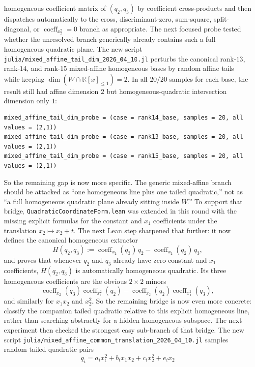 \documentclass[11pt]{article}
\begin{document}
homogeneous coefficient matrix of \((q_2,q_3)\) by coefficient cross-products
and then dispatches automatically to the cross, discriminant-zero, sum-square,
split-diagonal, or \(\operatorname{coeff}_{x_2^2}=0\) branch as appropriate.
The next focused probe tested whether the unresolved branch generically already
contains such a full homogeneous quadratic plane. The new script
\texttt{julia/mixed\_affine\_tail\_dim\_2026\_04\_10.jl} perturbs the canonical
rank-$13$, rank-$14$, and rank-$15$ mixed-affine homogeneous bases by random
affine tails while keeping \(\dim(W \cap \mathbb{R}[x]_{\le 1})=2\). In all
$20/20$ samples for each base, the result still had affine dimension $2$ but
homogeneous-quadratic intersection dimension only $1$:
\begin{verbatim}
mixed_affine_tail_dim_probe = (case = rank14_base, samples = 20, all values = (2,1))
mixed_affine_tail_dim_probe = (case = rank13_base, samples = 20, all values = (2,1))
mixed_affine_tail_dim_probe = (case = rank15_base, samples = 20, all values = (2,1))
\end{verbatim}
So the remaining gap is now more specific. The generic mixed-affine branch
should be attacked as ``one homogeneous line plus one tailed quadratic,'' not
as ``a full homogeneous quadratic plane already sitting inside \(W\).'' To
support that bridge, \texttt{QuadraticCoordinateForm.lean} was extended in this
round with the missing explicit formulas for the constant and \(x_1\)
coefficients under the translation \(x_2 \mapsto x_2+t\).
The next Lean step sharpened that further: it now defines the canonical
homogeneous extractor
\[
  H(q_2,q_3)
  :=
  \operatorname{coeff}_{x_2}(q_3)\,q_2
  -
  \operatorname{coeff}_{x_2}(q_2)\,q_3,
\]
and proves that whenever \(q_2\) and \(q_3\) already have zero constant and
\(x_1\) coefficients, \(H(q_2,q_3)\) is automatically homogeneous quadratic.
Its three homogeneous coefficients are the obvious \(2\times2\) minors
\[
  \operatorname{coeff}_{x_2}(q_3)\operatorname{coeff}_{x_1^2}(q_2) -
  \operatorname{coeff}_{x_2}(q_2)\operatorname{coeff}_{x_1^2}(q_3),
\]
and similarly for \(x_1x_2\) and \(x_2^2\). So the remaining bridge is now even
more concrete: classify the companion tailed quadratic relative to this
explicit homogeneous line, rather than searching abstractly for a hidden
homogeneous subspace.
The next experiment then checked the strongest easy sub-branch of that bridge.
The new script
\texttt{julia/mixed\_affine\_common\_translation\_2026\_04\_10.jl} samples
random tailed quadratic pairs
\[
  q_i=a_i x_1^2+b_i x_1x_2+c_i x_2^2+e_i x_2
\]
\end{document}

